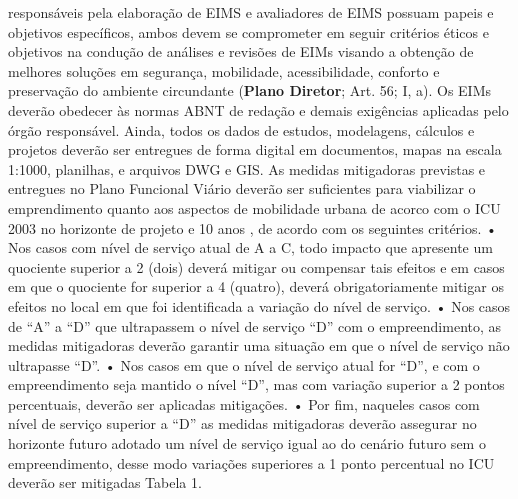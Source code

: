 \documentclass[]{article}
\begin{document}
responsáveis pela elaboração de EIMS e avaliadores de EIMS possuam
papeis e objetivos específicos, ambos devem se comprometer em seguir
critérios éticos e objetivos na condução de análises e revisões de EIMs
visando a obtenção de melhores soluções em segurança, mobilidade,
acessibilidade, conforto e preservação do ambiente circundante
(\textbf{Plano Diretor}; Art. 56; I, a). Os EIMs deverão obedecer às
normas ABNT de redação e demais exigências aplicadas pelo órgão
responsável. Ainda, todos os dados de estudos, modelagens, cálculos e
projetos deverão ser entregues de forma digital em documentos, mapas na
escala 1:1000, planilhas, e arquivos DWG e GIS. As medidas mitigadoras
previstas e entregues no Plano Funcional Viário deverão ser suficientes
para viabilizar o emprendimento quanto aos aspectos de mobilidade urbana
de acorco com o ICU 2003 no horizonte de projeto e 10 anos , de acordo
com os seguintes critérios. • Nos casos com nível de serviço atual de A
a C, todo impacto que apresente um quociente superior a 2 (dois) deverá
mitigar ou compensar tais efeitos e em casos em que o quociente for
superior a 4 (quatro), deverá obrigatoriamente mitigar os efeitos no
local em que foi identificada a variação do nível de serviço. • Nos
casos de ``A'' a ``D'' que ultrapassem o nível de serviço ``D'' com o
empreendimento, as medidas mitigadoras deverão garantir uma situação em
que o nível de serviço não ultrapasse ``D''. • Nos casos em que o nível
de serviço atual for ``D'', e com o empreendimento seja mantido o nível
``D'', mas com variação superior a 2 pontos percentuais, deverão ser
aplicadas mitigações. • Por fim, naqueles casos com nível de serviço
superior a ``D'' as medidas mitigadoras deverão assegurar no horizonte
futuro adotado um nível de serviço igual ao do cenário futuro sem o
empreendimento, desse modo variações superiores a 1 ponto percentual no
ICU deverão ser mitigadas Tabela 1.
\end{document}
